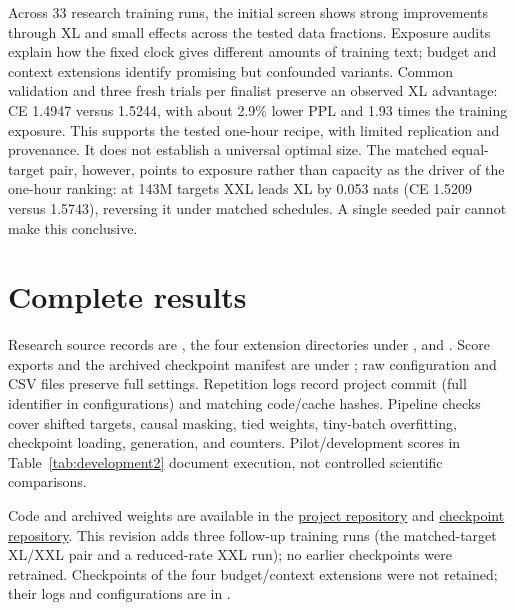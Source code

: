 \documentclass[10pt,twocolumn,letterpaper]{article}
\begin{document}
Across 33 research training runs, the initial screen shows strong improvements
through XL and small effects across the tested data fractions. Exposure audits
explain how the fixed clock gives different amounts of training text; budget
and context extensions identify promising but confounded variants. Common
validation and three fresh trials per finalist preserve an observed XL advantage:
CE 1.4947 versus 1.5244, with about 2.9\% lower PPL and 1.93 times the training
exposure. This supports the tested one-hour recipe, with limited replication and
provenance. It does not establish a universal optimal size. The matched equal-target pair, however,
points to exposure rather than capacity as the driver of the one-hour ranking: at 143M
targets XXL leads XL by 0.053 nats (CE 1.5209 versus 1.5743), reversing it under matched
schedules. A single seeded pair cannot make this conclusive.


\begingroup\raggedright

\endgroup

\newpage
\appendix
\section{Complete results}





Research source records are , the four extension directories
under , and . Score exports and the archived
checkpoint manifest are under ; raw configuration and
CSV files preserve full settings. Repetition logs record project commit
 (full identifier in configurations) and matching code/cache hashes.
Pipeline checks cover shifted targets, causal masking, tied weights, tiny-batch
overfitting, checkpoint loading, generation, and counters. Pilot/development
scores in Table~\ref{tab:development2} document execution, not controlled
scientific comparisons.

Code and archived weights are available in the
\href{https://github.com/KeremOzemre/Optimization-for-Large-Scale-Data}{project repository}
and \href{https://huggingface.co/dsa4212-tinystories/tinystories-nanogpt}{checkpoint repository}.
This revision adds three follow-up training runs (the matched-target XL/XXL pair and a reduced-rate XXL run); no earlier checkpoints were retrained. Checkpoints of the four budget/context extensions were not retained; their logs and configurations are in .
\end{document}
